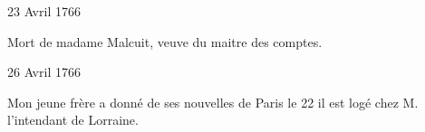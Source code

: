                      \begin{diary}{23 Avril 1766}{}
                        
                         Mort de madame Malcuit, veuve du maitre des
                              comptes.\bigskip
        
        
                     \end{diary}

                     \begin{diary}{26 Avril 1766}{}
                        
                        
                           Mon jeune frère a donné de
                           ses nouvelles
                           de Paris
                           le 22 il est logé chez
                           M. l'intendant
                              de Lorraine.
                        \bigskip
        
        
                     \end{diary}
                     

